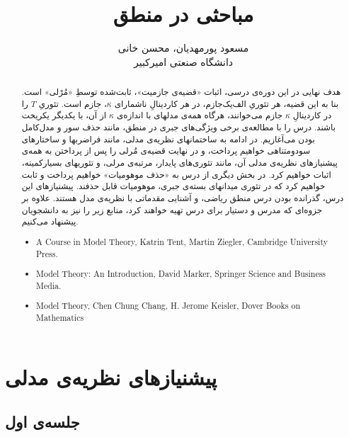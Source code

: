 \documentclass[12pt,a4paper]{report}
\title{مباحثی در منطق}
\author{مسعود پورمهدیان، محسن خانی\\
دانشگاه صنعتی امیرکبیر
}
\theoremstyle{colorhead}
\begin{document}
\sloppy 
\maketitle
\begin{abstract}
هدف نهایی در این دوره‌ی درسی، اثبات «قضیه‌ی جازمیت»، ثابت‌شده توسطِ «مُرْلی» است. بنا به این قضیه، هر تئوریِ الف‌یک‌جازم، در هر کاردینالِ ناشمارای 
$\kappa$،
 جازم است. تئوریِ
 $T$
  را در کاردینالِ 
  $\kappa$
   جازم می‌خوانند، هرگاه همه‌ی مدلهای با اندازه‌ی
  $\kappa$
    از آن، با یکدیگر یکریخت باشند.
درس را با مطالعه‌ی برخی ویژگی‌های جبری در منطق، مانند حذف سور و مدل‌کامل بودن می‌آغازیم. در ادامه به ساختمانهای نظریه‌ی مدلی، مانند فراضربها و ساختارهای سودومتناهی خواهیم پرداخت، و در نهایت قضیه‌ی مُرلی را پس از پرداختن به همه‌ی پیشنیازهای نظریه‌ی مدلی آن، مانند تئوری‌های پایدار، مرتبه‌ی مرلی، و تئوریهای بسیارکمینه، اثبات خواهیم کرد. در بخش دیگری از درس به «حذف موهومیات»‌ خواهیم پرداخت و ثابت خواهیم کرد که در تئوری میدانهای بسته‌ی جبری، موهومیات قابل‌ حذفند. پیشنیازهای این درس، گذرانده بودن درس منطق ریاضی، و آشنایی مقدماتی با نظریه‌ی مدل هستند. علاوه‌ بر جزوه‌ای که مدرس و دستیار برای درس تهیه خواهند کرد، منابع زیر 
را نیز به دانشجویان پیشنهاد می‌کنیم.
\begin{latin}
\begin{itemize}
\item 
    A Course in Model Theory, Katrin Tent, Martin Ziegler, Cambridge University Press.
\item
Model Theory: An Introduction, David Marker, Springer Science and Business Media.
\item  
Model Theory, Chen Chung Chang, H. Jerome Keisler, Dover Books on Mathematics
\end{itemize}
    \end{latin}
\end{abstract}
\tableofcontents
\pagebreak 
\chapter{پیشنیازهای نظریه‌ی مدلی}
\section{جلسه‌ی اول}
\end{document}

